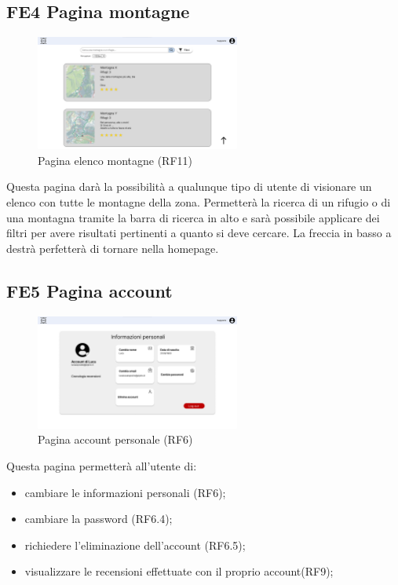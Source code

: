 \documentclass[a4paper,12pt]{article}
\begin{document}
\subsection*{FE4 Pagina montagne}
\begin{figure}[H]
   \centering
    \includegraphics[width=0.6\textwidth]{img/Pagina montagne.png}
    \caption{Pagina elenco montagne (RF11)}
\end{figure}
Questa pagina darà la possibilità a qualunque tipo di utente di visionare un elenco con tutte le montagne della zona. Permetterà la ricerca di un rifugio o di una montagna tramite la barra di ricerca in alto e sarà possibile applicare dei filtri per avere risultati pertinenti a quanto si deve cercare. La freccia in basso a destrà perfetterà di tornare nella homepage.


\subsection*{FE5 Pagina account}
\begin{figure}[H]
   \centering
    \includegraphics[width=0.6\textwidth]{img/Pagina account.png}
    \caption{Pagina account personale (RF6)}
\end{figure}

\newpage
Questa pagina permetterà all'utente di:
\begin{itemize}
    \item cambiare le informazioni personali (RF6);
    \item cambiare la password (RF6.4);
    \item richiedere l'eliminazione dell'account (RF6.5);
    \item visualizzare le recensioni effettuate con il proprio account(RF9);
\end{itemize}
\end{document}
